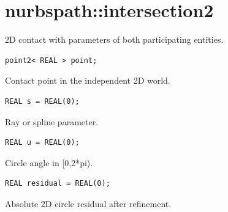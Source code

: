 \section{nurbspath::intersection2}
2D contact with parameters of both participating entities.
\par\noindent\begin{minipage}{\linewidth}
\begin{lstlisting}[style=apireference]
point2< REAL > point;
\end{lstlisting}
{\footnotesize Contact point in the independent 2D world.\par}
\end{minipage}\par\vspace{1pt}
\par\noindent\begin{minipage}{\linewidth}
\begin{lstlisting}[style=apireference]
REAL s = REAL(0);
\end{lstlisting}
{\footnotesize Ray or spline parameter.\par}
\end{minipage}\par\vspace{1pt}
\par\noindent\begin{minipage}{\linewidth}
\begin{lstlisting}[style=apireference]
REAL u = REAL(0);
\end{lstlisting}
{\footnotesize Circle angle in [0,2*pi).\par}
\end{minipage}\par\vspace{1pt}
\par\noindent\begin{minipage}{\linewidth}
\begin{lstlisting}[style=apireference]
REAL residual = REAL(0);
\end{lstlisting}
{\footnotesize Absolute 2D circle residual after refinement.\par}
\end{minipage}\par\vspace{1pt}
